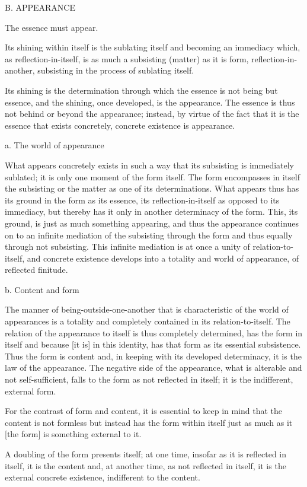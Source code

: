 
B. APPEARANCE

The essence must appear.

Its shining within itself is
the sublating itself
and becoming an immediacy
which, as reflection-in-itself, is
as much a subsisting (matter)
as it is form, reflection-in-another,
subsisting in the process of sublating itself.

Its shining is the determination
through which the essence is not being but essence,
and the shining, once developed, is the appearance.
The essence is thus not behind or beyond the appearance;
instead, by virtue of the fact that
it is the essence that exists concretely,
concrete existence is appearance.

a. The world of appearance

What appears concretely exists in such a way
that its subsisting is immediately sublated;
it is only one moment of the form itself.
The form encompasses in itself the subsisting
or the matter as one of its determinations.
What appears thus has its ground in the form
as its essence, its reflection-in-itself
as opposed to its immediacy, but thereby has it
only in another determinacy of the form.
This, its ground, is just as much something appearing,
and thus the appearance continues on to an infinite mediation
of the subsisting through the form
and thus equally through not subsisting.
This infinite mediation is at once
a unity of relation-to-itself,
and concrete existence develops into a totality
and world of appearance, of reflected finitude.

b. Content and form

The manner of being-outside-one-another that is
characteristic of the world of appearances is
a totality and completely contained in its relation-to-itself.
The relation of the appearance to itself is
thus completely determined, has the form in itself
and because [it is] in this identity,
has that form as its essential subsistence.
Thus the form is content and,
in keeping with its developed determinacy,
it is the law of the appearance.
The negative side of the appearance,
what is alterable and not self-sufficient,
falls to the form as not reflected in itself;
it is the indifferent, external form.

For the contrast of form and content,
it is essential to keep in mind that
the content is not formless but
instead has the form within itself
just as much as it [the form] is
something external to it.

A doubling of the form presents itself;
at one time,
insofar as it is reflected in itself,
it is the content and,
at another time,
as not reflected in itself,
it is the external concrete existence,
indifferent to the content.

